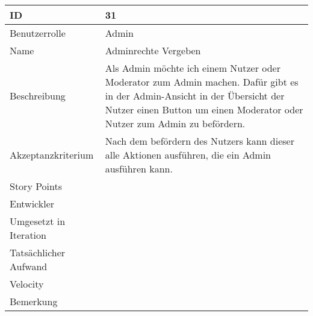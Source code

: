 \begin{tabularx}{\textwidth}{|p{}|X|}
	\hline
	ID & 31 \\
	\hline
	Benutzerrolle & Admin \\
	\hline
	Name & Adminrechte Vergeben\\
	\hline
	Beschreibung & Als Admin möchte ich einem Nutzer oder Moderator zum Admin machen. Dafür gibt es in der Admin-Ansicht in der Übersicht der Nutzer einen Button um einen Moderator oder Nutzer zum Admin zu befördern.  \\
	\hline
	Akzeptanzkriterium & Nach dem befördern des Nutzers kann dieser alle Aktionen ausführen, die ein Admin ausführen kann. \\
	\hline
	Story Points &  \\
	\hline
	Entwickler &  \\
	\hline
	Umgesetzt in Iteration & \\
	\hline
	Tatsächlicher Aufwand & \\
	\hline
	Velocity & \\
	\hline
	Bemerkung & \\
	\hline
\end{tabularx}
\vspace{20pt}
